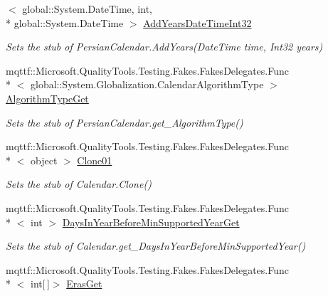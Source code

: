 \begin{DoxyCompactItemize}
$<$ global\-::\-System.\-Date\-Time, int, \\*
global\-::\-System.\-Date\-Time $>$ \hyperlink{class_system_1_1_globalization_1_1_fakes_1_1_stub_persian_calendar_aada000274c8a71a8544695969df6aefc}{Add\-Years\-Date\-Time\-Int32}
\begin{DoxyCompactList}\small\item\em Sets the stub of Persian\-Calendar.\-Add\-Years(\-Date\-Time time, Int32 years)\end{DoxyCompactList}\item 
mqttf\-::\-Microsoft.\-Quality\-Tools.\-Testing.\-Fakes.\-Fakes\-Delegates.\-Func\\*
$<$ global\-::\-System.\-Globalization.\-Calendar\-Algorithm\-Type $>$ \hyperlink{class_system_1_1_globalization_1_1_fakes_1_1_stub_persian_calendar_ad4eb4ae0f6514039c0f8c9ed8f358399}{Algorithm\-Type\-Get}
\begin{DoxyCompactList}\small\item\em Sets the stub of Persian\-Calendar.\-get\-\_\-\-Algorithm\-Type()\end{DoxyCompactList}\item 
mqttf\-::\-Microsoft.\-Quality\-Tools.\-Testing.\-Fakes.\-Fakes\-Delegates.\-Func\\*
$<$ object $>$ \hyperlink{class_system_1_1_globalization_1_1_fakes_1_1_stub_persian_calendar_aa81667ac08e8f7762d3084b859ec7618}{Clone01}
\begin{DoxyCompactList}\small\item\em Sets the stub of Calendar.\-Clone()\end{DoxyCompactList}\item 
mqttf\-::\-Microsoft.\-Quality\-Tools.\-Testing.\-Fakes.\-Fakes\-Delegates.\-Func\\*
$<$ int $>$ \hyperlink{class_system_1_1_globalization_1_1_fakes_1_1_stub_persian_calendar_a0384520af3524b88f0155e1b05174c10}{Days\-In\-Year\-Before\-Min\-Supported\-Year\-Get}
\begin{DoxyCompactList}\small\item\em Sets the stub of Calendar.\-get\-\_\-\-Days\-In\-Year\-Before\-Min\-Supported\-Year()\end{DoxyCompactList}\item 
mqttf\-::\-Microsoft.\-Quality\-Tools.\-Testing.\-Fakes.\-Fakes\-Delegates.\-Func\\*
$<$ int\mbox{[}$\,$\mbox{]}$>$ \hyperlink{class_system_1_1_globalization_1_1_fakes_1_1_stub_persian_calendar_ac0bb7c890d2eb2cfcb8ce1f06a6bbe26}{Eras\-Get}

\end{DoxyCompactItemize}
